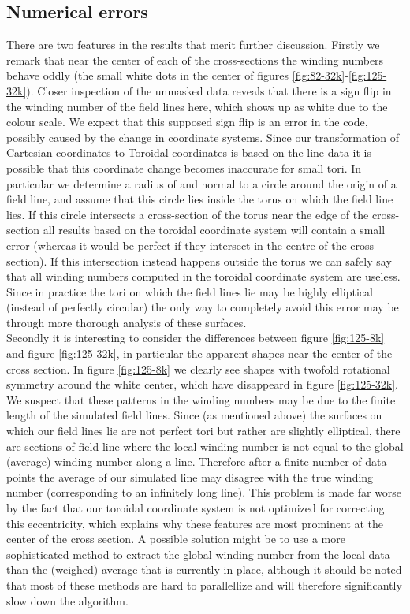 \documentclass{article}
\begin{document}
\subsection{Numerical errors}
There are two features in the results that merit further discussion. Firstly we remark that near the center of each of the cross-sections the winding numbers behave oddly (the small white dots in the center of figures \ref{fig:82-32k}-\ref{fig:125-32k}). Closer inspection of the unmasked data reveals that there is a sign flip in the winding number of the field lines here, which shows up as white due to the colour scale. We expect that this supposed sign flip is an error in the code, possibly caused by the change in coordinate systems. Since our transformation of Cartesian coordinates to Toroidal coordinates is based on the line data it is possible that this coordinate change becomes inaccurate for small tori. In particular we determine a radius of and normal to a circle around the origin of a field line, and assume that this circle lies inside the torus on which the field line lies. If this circle intersects a cross-section of the torus near the edge of the cross-section all results based on the toroidal coordinate system will contain a small error (whereas it would be perfect if they intersect in the centre of the cross section). If this intersection instead happens outside the torus we can safely say that all winding numbers computed in the toroidal coordinate system are useless. Since in practice the tori on which the field lines lie may be highly elliptical (instead of perfectly circular) the only way to completely avoid this error may be through more thorough analysis of these surfaces.\\

Secondly it is interesting to consider the differences between figure \ref{fig:125-8k} and figure \ref{fig:125-32k}, in particular the apparent shapes near the center of the cross section. In figure \ref{fig:125-8k} we clearly see shapes with twofold rotational symmetry around the white center, which have disappeard in figure \ref{fig:125-32k}. We suspect that these patterns in the winding numbers may be due to the finite length of the simulated field lines. Since (as mentioned above) the surfaces on which our field lines lie are not perfect tori but rather are slightly elliptical, there are sections of field line where the local winding number is not equal to the global (average) winding number along a line. Therefore after a finite number of data points the average of our simulated line may disagree with the true winding number (corresponding to an infinitely long line). This problem is made far worse by the fact that our toroidal coordinate system is not optimized for correcting this eccentricity, which explains why these features are most prominent at the center of the cross section. A possible solution might be to use a more sophisticated method to extract the global winding number from the local data than the (weighed) average that is currently in place, although it should be noted that most of these methods are hard to parallellize and will therefore significantly slow down the algorithm.\\
\end{document}
